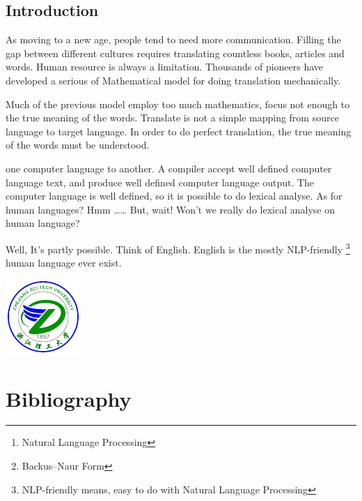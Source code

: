 \documentclass[a4paper,12pt]{article}
\title{\entitle}
\author{\enauthor}
\date{}
\begin{document}
\sloppy


\setcounter{page}{1}

\maketitle

\begin{abstract}

Real understanding of English text is required by much of tasks such as \emph{Machine Translation}, \emph{NLP\footnote{Natural Language Processing}}, etc. Building Concrete Syntax \mbox{Tree \cite{cst}} is the very first step of the \mbox{understanding} process. This thesis brings you one possible way of building Parse Tree of Natural Language -- English. It employs \emph{HMM based part-of-speech tagging} and \emph{BNF\footnote{Backus–Naur Form\protect\cite{BNF}} based Natural Language Parse Program}. 
\end{abstract}
\begin{onehalfspace}

\section{Introduction}

As moving to a new age, people tend to need more communication. Filling the gap
between different cultures requires translating countless books, articles and
words. Human resource is always a limitation. Thousands of pioneers have developed
a serious of Mathematical model for doing translation mechanically. 

Much of the previous model employ too much mathematics, focus not enough to the true meaning
of the words. Translate is not a simple mapping from source language to target language.
In order to do perfect translation, the true meaning of the words must be understood. 

one computer language to another. A compiler accept well defined computer language
text, and produce well defined computer language output. The computer language is well
defined, so it is possible to do lexical analyse. As for human languages? Hmm \ldots\ldots 
But, wait! Won't we really do lexical analyse on human language?

Well, It's partly possible. Think of English. English is the mostly
NLP-friendly \footnote{NLP-friendly means, easy to do with Natural Language Processing}
human language ever exist.

\includegraphics{zstu}

\end{onehalfspace}
\section{Bibliography}


\end{document}
